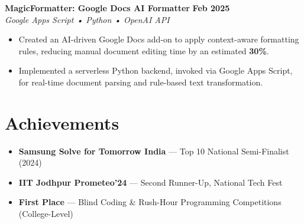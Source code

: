 \documentclass[letterpaper,10pt]{article}
\newcommand{\projecttitle}[1]{{\large\bfseries\color{black} #1}}
\newcommand{\projecttech}[1]{{\itshape\color{graytext} #1}}
\newcommand{\projectdate}[1]{{\small\bfseries #1}}
\newcommand{\projectlink}[2]{\href{#2}{\small #1}\hspace{1em}}
\begin{document}
\projecttitle{MagicFormatter: Google Docs AI Formatter} \projectlink{\faGithub}{https://github.com/krishnabansal89/magicFormatter} \hfill \projectdate{Feb 2025}\\
\projecttech{Google Apps Script • Python • OpenAI API}
\begin{itemize}[leftmargin=*,noitemsep]
\item Created an AI-driven Google Docs add-on to apply context-aware formatting rules, reducing manual document editing time by an estimated \textbf{30\%}.
\item Implemented a serverless Python backend, invoked via Google Apps Script, for real-time document parsing and rule-based text transformation.
\end{itemize}

\section{Achievements}
\begin{itemize}[leftmargin=*,noitemsep]
\item \textbf{Samsung Solve for Tomorrow India} — Top 10 National Semi-Finalist (2024)
\item \textbf{IIT Jodhpur Prometeo'24} — Second Runner-Up, National Tech Fest
\item \textbf{First Place} — Blind Coding \& Rush-Hour Programming Competitions (College-Level)
\end{itemize}
\end{document}
